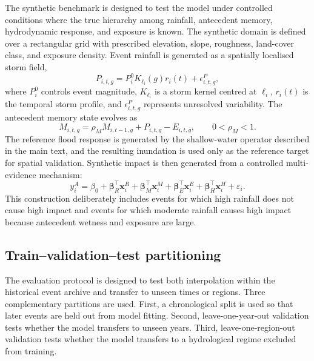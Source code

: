 \documentclass[pdflatex,sn-mathphys-ay]{sn-jnl}
\theoremstyle{thmstyleone}
\begin{document}
\begin{appendices}
The synthetic benchmark is designed to test the model under controlled
conditions where the true hierarchy among rainfall, antecedent memory,
hydrodynamic response, and exposure is known.  The synthetic domain is
defined over a rectangular grid with prescribed elevation, slope,
roughness, land-cover class, and exposure density.  Event rainfall is
generated as a spatially localised storm field,
\begin{equation}
  P_{i,t,g}
  =
  P^{0}_{i}
  K_{\ell_i}(g)
  r_i(t)
  +
  \epsilon^{P}_{i,t,g},
  \label{eq:app_synthetic_rain}
\end{equation}
where $P^{0}_{i}$ controls event magnitude, $K_{\ell_i}$ is a storm
kernel centred at $\ell_i$, $r_i(t)$ is the temporal storm profile,
and $\epsilon^{P}_{i,t,g}$ represents unresolved variability.  The
antecedent memory state evolves as
\begin{equation}
  M_{i,t,g}
  =
  \rho_M M_{i,t-1,g}
  +
  P_{i,t,g}
  -
  E_{i,t,g},
  \qquad
  0<\rho_M<1.
  \label{eq:app_synthetic_memory}
\end{equation}
The reference flood response is generated by the shallow-water
operator described in the main text, and the resulting inundation is
used only as the reference target for spatial validation.  Synthetic
impact is then generated from a controlled multi-evidence mechanism:
\begin{equation}
  y^{A}_{i}
  =
  \beta_0
  +
  \boldsymbol{\beta}^{\top}_{R}
  \mathbf{x}^{R}_{i}
  +
  \boldsymbol{\beta}^{\top}_{M}
  \mathbf{x}^{M}_{i}
  +
  \boldsymbol{\beta}^{\top}_{E}
  \mathbf{x}^{E}_{i}
  +
  \boldsymbol{\beta}^{\top}_{H}
  \mathbf{x}^{H}_{i}
  +
  \varepsilon_i.
  \label{eq:app_synthetic_impact}
\end{equation}
This construction deliberately includes events for which high rainfall
does not cause high impact and events for which moderate rainfall
causes high impact because antecedent wetness and exposure are large.

\subsection{Train--validation--test partitioning}
\label{app:train_test_partitioning}

The evaluation protocol is designed to test both interpolation within
the historical event archive and transfer to unseen times or regions.
Three complementary partitions are used.  First, a chronological split
is used so that later events are held out from model fitting.  Second,
leave-one-year-out validation tests whether the model transfers to
unseen years.  Third, leave-one-region-out validation tests whether
the model transfers to a hydrological regime excluded from training.


\end{appendices}
\end{document}

